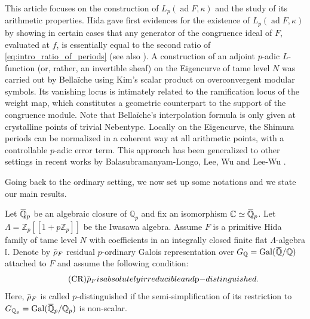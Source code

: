 \documentclass[12pt]{amsart}
\newcommand\bI{\mathbb{I}}
\newcommand\bC{\mathbb{C}}
\newcommand\bQ{\mathbb{Q}}
\newcommand\Zp{{\mathbb{Z}_p}}
\newcommand\Qp{{\mathbb{Q}_p}}
\newcommand{\ob}[1]{\mkern 1.5mu\overline{\mkern-1.5mu#1\mkern-1.5mu}\mkern 1.5mu}
\DeclareMathOperator{\Gal}{Gal}
\DeclareMathOperator{\ad}{ad}
\theoremstyle{defstyle}
\theoremstyle{thmstyle}
\begin{document}
This article focuses on the construction of $L_p(\ad F,\kappa)$ and the study of its arithmetic properties. 
Hida  \cite{hidamodules} gave first evidences for the existence of $L_p(\ad F,\kappa)$ by showing in certain cases that any generator of the congruence ideal of $F$, evaluated at $f$, is essentially equal to the second ratio of \eqref{eq:intro_ratio_of_periods} (see also \cite[Corollary 6.29]{hidapune}).
A construction of an adjoint $p$-adic $L$-function (or, rather, an invertible sheaf) on the Eigencurve of tame level $N$ was carried out by Bella\"iche \cite{eigenbook} using Kim's scalar product on overconvergent modular symbols.
Its vanishing locus is intimately related to the ramification locus of the weight map, which constitutes a geometric counterpart to the support of the congruence module.
Note that Bella\"iche's interpolation formula is only given at crystalline points of trivial Nebentype. Locally on the Eigencurve, the Shimura periods can be normalized in a coherent way at all arithmetic points, with a controllable $p$-adic error term. This approach has been generalized to other settings in recent works by Balasubramanyam-Longo, Lee, Wu and Lee-Wu \cite{baskarlongo,lee2021padic,wusiegel,leewu}.

Going back to the ordinary setting, we now set up some notations and we state our main results. 

Let $\ob{\bQ}_p$ be an algebraic closure of $\Qp$ and fix an isomorphism $\bC\simeq \ob{\bQ}_p$. Let $\Lambda=\Zp[[1+p\Zp]]$ be the Iwasawa algebra. Assume $F$ is a primitive Hida family of tame level $N$ with coefficients in an integrally closed finite flat $\Lambda$-algebra $\bI$. Denote by $\ob{\rho}_F$ residual $p$-ordinary Galois representation over $G_{\bQ}=\Gal(\ob{\bQ}/\bQ)$ attached to $F$ and assume the following condition:
\begin{equation} \tag{CR}\label{tag:cr}
	\ob{\rho}_F \textrm{ is absolutely irreducible and $p$-distinguished.}
\end{equation}
Here, $\ob{\rho}_F$ is called $p$-distinguished if the semi-simplification of its restriction to $G_{\bQ_p}=\Gal(\ob{\bQ}_p/\Qp)$ is non-scalar.
\end{document}
